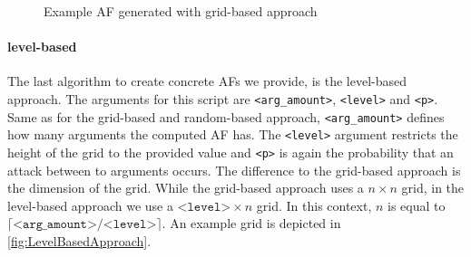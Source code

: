 \begin{figure}[h]
\begin{minipage}{.3\textwidth}
    \label{af:ImplementationGridBasedExampleAFsc}
\end{minipage}
\caption{Example AF generated with grid-based approach}
\label{fig:ImplementationGridBasedExampleAFs}
\end{figure}
\vspace{0.3cm}



\paragraph{level-based} The last algorithm to create concrete AFs we provide, is the level-based approach. The arguments for this script are \texttt{<arg\_amount>}, \texttt{<level>} and \texttt{<p>}. Same as for the grid-based and random-based approach, \texttt{<arg\_amount>} defines how many arguments the computed AF has. The \texttt{<level>} argument restricts the height of the grid to the provided value and \texttt{<p>} is again the probability that an attack between to arguments occurs. The difference to the grid-based approach is the dimension of the grid. While the grid-based approach uses a $n \times n$ grid, in the level-based approach we use a $\texttt{<level>} \times n$ grid. In this context, $n$ is equal to $\lceil \texttt{<arg\_amount>}/\texttt{<level>} \rceil$. An example grid is depicted in \cref{fig:LevelBasedApproach}.


